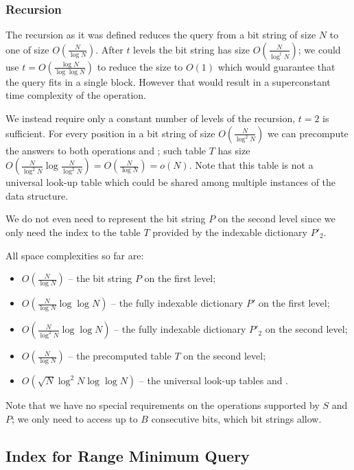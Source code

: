 \subsubsection{Recursion}

The recursion as it was defined reduces the query from a bit string of size $N$ to one of size $O(\frac{N}{\log N})$.
After $t$ levels the bit string has size $O(\frac{N}{\log^t N})$; we could use $t = O(\frac{\log N}{\log\log N})$ to reduce the size to $O(1)$ which would guarantee that the query fits in a single block.
However that would result in a superconstant time complexity of the operation.

We instead require only a constant number of levels of the recursion, $t = 2$ is sufficient.
For every position in a bit string of size $O(\frac{N}{\log^2 N})$ we can precompute the answers to both operations \match{} and \enclose{}; such table $T$ has size $O(\frac{N}{\log^2 N} \log \frac{N}{\log^2 N}) = O(\frac{N}{\log N}) = o(N)$.
Note that this table is not a universal look-up table which could be shared among multiple instances of the data structure.

We do not even need to represent the bit string $P$ on the second level since we only need the index to the table $T$ provided by the indexable dictionary $P'_2$.

\bigskip

All space complexities so far are:
\begin{itemize}
	\item $O(\frac{N}{\log N})$ -- the bit string $P$ on the first level;
	\item $O(\frac{N}{\log N}\log \log N)$ -- the fully indexable dictionary $P'$ on the first level;
	\item $O(\frac{N}{\log^2 N}\log \log N)$ -- the fully indexable dictionary $P'_2$ on the second level;
	\item $O(\frac{N}{\log N})$ -- the precomputed table $T$ on the second level;
	\item $O(\sqrt{N}\log^2 N \log\log N)$ -- the universal look-up tables \fwdSearch{} and \bwdSearch{}.
\end{itemize}
Note that we have no special requirements on the operations supported by $S$ and $P$; we only need to access up to $B$ consecutive bits, which bit strings allow.

\subsection{Index for Range Minimum Query}

